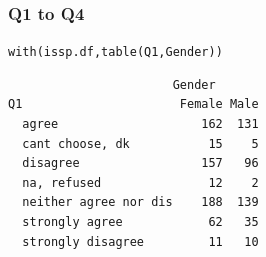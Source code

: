 \documentclass{beamer}\usepackage[]{graphicx}\usepackage[]{color}
\makeatletter
\newcommand{\hlstd}[1]{\textcolor[rgb]{0,0,0}{#1}}%
\newcommand{\hlkwd}[1]{\textcolor[rgb]{0,0.267,0.4}{#1}}%
\newenvironment{kframe}{%
 \def\at@end@of@kframe{}%
 \ifinner\ifhmode%
  \def\at@end@of@kframe{\end{minipage}}%
  \begin{minipage}{\columnwidth}%
 \fi\fi%
 \def\FrameCommand##1{\hskip\@totalleftmargin \hskip-\fboxsep
 \colorbox{shadecolor}{##1}\hskip-\fboxsep
     \hskip-\linewidth \hskip-\@totalleftmargin \hskip\columnwidth}%
 \MakeFramed {\advance\hsize-\width
   \@totalleftmargin\z@ \linewidth\hsize
   \@setminipage}}%
 {\par\unskip\endMakeFramed%
 \at@end@of@kframe}
\newenvironment{knitrout}{}{} %
\makeatother
\begin{document}
\begin{frame}[fragile]
  \frametitle{Q1 to Q4}
\begin{knitrout}
\color{fgcolor}\begin{kframe}
\begin{alltt}
\hlkwd{with}\hlstd{(issp.df,} \hlkwd{table}\hlstd{(Q1, Gender))}
\end{alltt}
\begin{verbatim}
                       Gender
Q1                      Female Male
  agree                    162  131
  cant choose, dk           15    5
  disagree                 157   96
  na, refused               12    2
  neither agree nor dis    188  139
  strongly agree            62   35
  strongly disagree         11   10
\end{verbatim}
\end{kframe}
\end{knitrout}
\end{frame}
\end{document}
